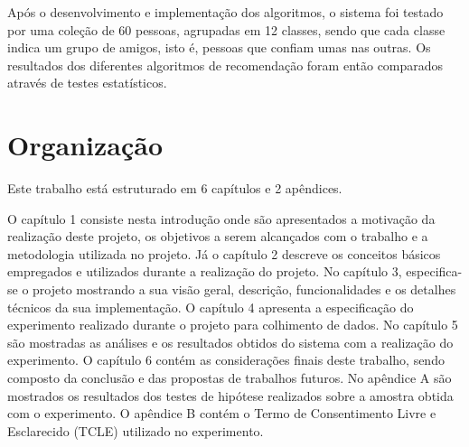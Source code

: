  Após o desenvolvimento e implementação dos algoritmos, o sistema foi testado por uma coleção de 60 pessoas, agrupadas em 12 classes, sendo que cada classe indica um grupo de amigos, isto é, pessoas que confiam umas nas outras. Os resultados dos diferentes algoritmos de recomendação foram então comparados através de testes estatísticos.


\section{Organização} %

 Este trabalho está estruturado em 6 capítulos e 2 apêndices.
 
 O capítulo 1 consiste nesta introdução onde são apresentados a motivação da realização deste projeto, os objetivos a serem alcançados com o trabalho e a metodologia utilizada no projeto.
 Já o capítulo 2 descreve os conceitos básicos empregados e utilizados durante a realização do projeto.
 No capítulo 3,	especifica-se o projeto mostrando a sua visão geral, descrição, funcionalidades e os detalhes técnicos da sua implementação.
 O capítulo 4 apresenta a especificação do experimento realizado durante o projeto para colhimento de dados.
 No capítulo 5 são mostradas as análises e os resultados obtidos do sistema com a realização do experimento.
 O capítulo 6 contém as considerações finais deste trabalho, sendo composto da conclusão e das propostas de trabalhos futuros.
 No apêndice A são mostrados os resultados dos testes de hipótese realizados sobre a amostra obtida com o experimento.
 O apêndice B contém o Termo de Consentimento Livre e Esclarecido (TCLE) utilizado no experimento.



